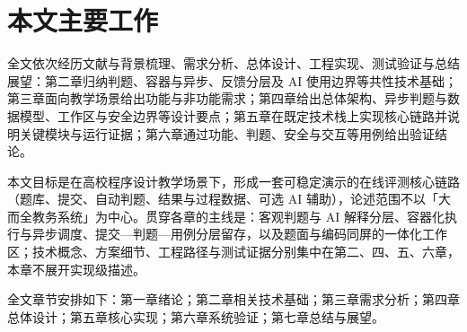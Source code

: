 \section{本文主要工作}

全文依次经历文献与背景梳理、需求分析、总体设计、工程实现、测试验证与总结展望：第二章归纳判题、容器与异步、反馈分层及 AI 使用边界等共性技术基础\cite{kurnia2001online,leal2003mooshak,ala2005survey,keuning2018feedback,barczak2023automated,burns2016borg,balalaie2016microservices,difrancesco2019microservices,sarsa2022llm,jacobs2024feedback,chenjuan2020online,hezhenwei2020kubernetes,wangfang2023ai,zhanghongzhuo2024genai,tran2013uoj,alemu2023serverless,ihantola2011automated,lubin2025llm}；第三章面向教学场景给出功能与非功能需求；第四章给出总体架构、异步判题与数据模型、工作区与安全边界等设计要点；第五章在既定技术栈上实现核心链路并说明关键模块与运行证据；第六章通过功能、判题、安全与交互等用例给出验证结论。

本文目标是在高校程序设计教学场景下，形成一套可稳定演示的在线评测核心链路（题库、提交、自动判题、结果与过程数据、可选 AI 辅助），论述范围不以「大而全教务系统」为中心。贯穿各章的主线是：客观判题与 AI 解释分层、容器化执行与异步调度、提交—判题—用例分层留存，以及题面与编码同屏的一体化工作区；技术概念、方案细节、工程路径与测试证据分别集中在第二、四、五、六章，本章不展开实现级描述。

全文章节安排如下：第一章绪论；第二章相关技术基础；第三章需求分析；第四章总体设计；第五章核心实现；第六章系统验证；第七章总结与展望。
